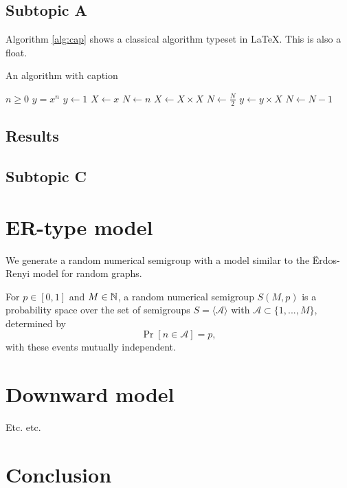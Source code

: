 \subsection{Subtopic A}\label{sec:contrib1:theme1:A}

Algorithm \ref{alg:cap} shows a classical algorithm typeset in \LaTeX{}. This is also a float.

\begin{algorithm}
\caption{An algorithm with caption}\label{alg:cap}
\begin{algorithmic}
\Require $n \geq 0$
\Ensure $y = x^n$
\State $y \gets 1$
\State $X \gets x$
\State $N \gets n$
    \State $X \gets X \times X$
    \State $N \gets \frac{N}{2}$  
    \State $y \gets y \times X$
    \State $N \gets N - 1$
\EndIf
\EndWhile
\end{algorithmic}
\end{algorithm}

\subsection{Results}\label{sec:contrib1:theme1:B}

\subsection{Subtopic C}\label{sec:contrib1:theme1:C}

\section{ER-type model}

We generate a random numerical semigroup with a model similar to the Ërdos-Renyi model for random graphs. 

\begin{definition}
    For $p \in [0, 1]$ and $M \in \mathbb{N}$, a random numerical semigroup $S(M, p)$ is a probability space over the set of semigroups $S = \langle\mathcal{A}\rangle$ with $\mathcal{A} \subset \{1,...,M\}$, determined by
    \[\Pr[n \in \mathcal{A}] = p,\]
    with these events mutually independent.
\end{definition}

\section{Downward model}\label{sec:contrib1:theme2}

Etc. etc.



\section{Conclusion}
